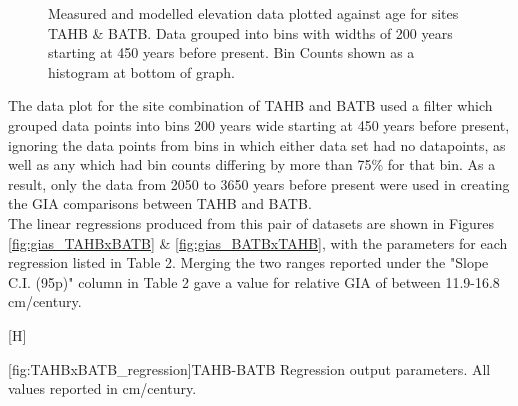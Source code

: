 \begin{figure}[H]
	\caption{Measured and modelled elevation data plotted against age for sites TAHB \& BATB. Data grouped into bins with widths of 200 years starting at 450 years before present. Bin Counts shown as a histogram at bottom of graph.}	
	\label{fig:data_TAHBxBATB}
\end{figure}

The data plot for the site combination of TAHB and BATB used a filter which 
grouped data points into bins 200 years wide starting at 450 years before present,
ignoring the data points from bins in which either data set had no datapoints,
as well as any which had bin counts differing by more than 75\% for that bin.
As a result, only the data from 2050 to 3650 years before present were used in
creating the GIA comparisons between TAHB and BATB.\\
The linear regressions produced from this pair of datasets are shown in Figures 
\ref{fig:gias_TAHBxBATB} \& \ref{fig:gias_BATBxTAHB}, with the parameters for each
regression listed in Table 2. Merging the two ranges
reported under the "Slope C.I. (95p)" column in Table 2 gave
a value for relative GIA of between 11.9-16.8 cm/century. \\


\begin{center}[H]
	\begin{flushleft}
	[fig:TAHBxBATB_regression]{TAHB-BATB Regression output parameters. All values reported in cm/century.}
	\end{flushleft}
	\label{fig:TAHBxBATB_regression}
\end{center}


